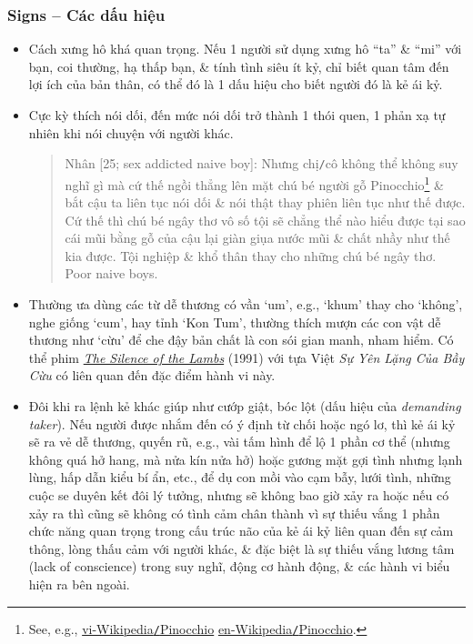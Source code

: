 \documentclass[12pt,twoside]{book}
\begin{document}
\subsubsection{Signs -- Các dấu hiệu}
\begin{itemize}
	\item Cách xưng hô khá quan trọng. Nếu 1 người sử dụng xưng hô ``ta'' \& ``mi'' với bạn, coi thường, hạ thấp bạn, \& tính tình siêu ít kỷ, chỉ biết quan tâm đến lợi ích của bản thân, có thể đó là 1 dấu hiệu cho biết người đó là kẻ ái kỷ.
	\item Cực kỳ thích nói dối, đến mức nói dối trở thành 1 thói quen, 1 phản xạ tự nhiên khi nói chuyện với người khác.
	\begin{quote}
		{\sf Nhân [25; sex addicted naive boy]}: Nhưng chị{\tt/}cô không thể không suy nghĩ gì mà cứ thế ngồi thẳng lên mặt chú bé người gỗ {\sf Pinocchio}\footnote{See, e.g., \href{https://vi.wikipedia.org/wiki/Pinocchio}{vi-Wikipedia{\tt/}Pinocchio} \href{https://en.wikipedia.org/wiki/Pinocchio}{en-Wikipedia{\tt/}Pinocchio}.} \& bắt cậu ta liên tục nói dối \& nói thật thay phiên liên tục như thế được. Cứ thế thì chú bé ngây thơ vô số tội sẽ chẳng thể nào hiểu được tại sao cái mũi bằng gỗ của cậu lại giàn giụa nước mũi \& chất nhầy như thế kia được. Tội nghiệp \& khổ thân thay cho những chú bé ngây thơ. Poor naive boys.
	\end{quote}
	\item Thường ưa dùng các từ dễ thương có vần `um', e.g., `khum' thay cho `không', nghe giống `cum', hay tỉnh `Kon Tum', thường thích mượn các con vật dễ thương như `cừu' để che đậy bản chất là con sói gian manh, nham hiểm. Có thể phim \href{https://www.imdb.com/title/tt0102926}{\it The Silence of the Lambs} (1991) với tựa Việt {\it Sự Yên Lặng Của Bầy Cừu} có liên quan đến đặc điểm hành vi này.
	\item Đôi khi ra lệnh kẻ khác giúp như cướp giật, bóc lột (dấu hiệu của {\it demanding taker}). Nếu người được nhắm đến có ý định từ chối hoặc ngó lơ, thì kẻ ái kỷ sẽ ra vẻ dễ thương, quyến rũ, e.g., vài tấm hình để lộ 1 phần cơ thể (nhưng không quá hở hang, mà nửa kín nửa hở) hoặc gương mặt gợi tình nhưng lạnh lùng, hấp dẫn kiểu bí ẩn, etc., để dụ con mồi vào cạm bẫy, lưới tình, những cuộc se duyên kết đôi lý tưởng, nhưng sẽ không bao giờ xảy ra hoặc nếu có xảy ra thì cũng sẽ không có tình cảm chân thành vì sự thiếu vắng 1 phần chức năng quan trọng trong cấu trúc não của kẻ ái kỷ liên quan đến sự cảm thông, lòng thấu cảm với người khác, \& đặc biệt là sự thiếu vắng lương tâm (lack of conscience) trong suy nghĩ, động cơ hành động, \& các hành vi biểu hiện ra bên ngoài.
\end{itemize}
\end{document}
